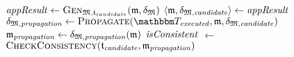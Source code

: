 \begin{algorithm}
\begin{algorithmic}[1]
         \label{algo:orchestration:provenance:line:loop_start}
            \State $\mathit{appResult} \gets \textsc{Gen}_{\mathfrak{M}, \mathfrak{t}_{candidate}}(\mathfrak{m}, \mathfrak{\delta}_{\mathfrak{M}})$ \label{algo:orchestration:provenance:line:first_execution}
                \State \Return{$\bot$} \label{algo:orchestration:provenance:line:bot_application}
            \EndIf
            \State $\langle \mathfrak{m}, \mathfrak{\delta}_{\mathfrak{M},\mathit{candidate}} \rangle \gets \mathit{appResult}$
            \State $\changetuple{\metamodeltuple{M},\mathvariable{propagation}} \gets \function{Propagate}(\provalgexecuted, \modeltuple{m}, \changetuple{\metamodeltuple{M},\mathvariable{candidate}})$ \label{algo:orchestration:provenance:line:recursive_call}
                \State \Return{$\bot$} \label{algo:orchestration:provenance:line:bot_recursion}
            \EndIf
            \State $\mathfrak{m}_{\mathit{propagation}} \gets \mathfrak{\delta}_{\mathfrak{M},\mathit{propagation}}(\mathfrak{m})$ %
            \State $\mathit{isConsistent}$ $\leftarrow$ $\textsc{CheckConsistency}(\mathfrak{t}_{\mathit{candidate}}, \mathfrak{m}_{\mathit{propagation}})$
             \label{algo:orchestration:provenance:line:bot_failcheck}
                \State \Return{$\bot$} \label{algo:orchestration:provenance:line:bot_nonreactiveconverging}

\end{algorithmic}
\end{algorithm}
